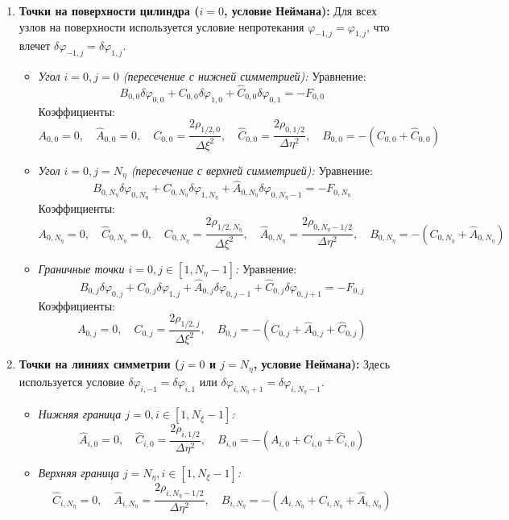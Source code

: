 	\begin{enumerate}
		\item \textbf{Точки на поверхности цилиндра ($i=0$, условие Неймана):} 
		Для всех узлов на поверхности используется условие непротекания $\varphi_{-1,j} = \varphi_{1,j}$, что влечет $\delta\varphi_{-1,j} = \delta\varphi_{1,j}$.
		\begin{itemize}
			\item \textit{Угол $i=0, j=0$ (пересечение с нижней симметрией):}
			Уравнение:
			\[ B_{0,0} \delta\varphi_{0,0} + C_{0,0} \delta\varphi_{1,0} + \hat{C}_{0,0} \delta\varphi_{0,1} = -F_{0,0} \]
			Коэффициенты:
			\[ A_{0,0} = 0, \quad \hat{A}_{0,0} = 0, \quad C_{0,0} = \frac{2\rho_{1/2,0}}{\Delta \xi^2}, \quad \hat{C}_{0,0} = \frac{2\rho_{0,1/2}}{\Delta \eta^2}, \quad B_{0,0} = -(C_{0,0} + \hat{C}_{0,0}) \]
			
			\item \textit{Угол $i=0, j=N_\eta$ (пересечение с верхней симметрией):}
			Уравнение:
			\[ B_{0,N_\eta} \delta\varphi_{0,N_\eta} + C_{0,N_\eta} \delta\varphi_{1,N_\eta} + \hat{A}_{0,N_\eta} \delta\varphi_{0,N_\eta-1} = -F_{0,N_\eta} \]
			Коэффициенты:
			\[ A_{0,N_\eta} = 0, \quad \hat{C}_{0,N_\eta} = 0, \quad C_{0,N_\eta} = \frac{2\rho_{1/2,N_\eta}}{\Delta \xi^2}, \quad \hat{A}_{0,N_\eta} = \frac{2\rho_{0,N_\eta-1/2}}{\Delta \eta^2}, \quad B_{0,N_\eta} = -(C_{0,N_\eta} + \hat{A}_{0,N_\eta}) \]
			
			\item \textit{Граничные точки $i=0, j \in [1, N_\eta-1]$:}
			Уравнение:
			\[ B_{0,j} \delta\varphi_{0,j} + C_{0,j} \delta\varphi_{1,j} + \hat{A}_{0,j} \delta\varphi_{0,j-1} + \hat{C}_{0,j} \delta\varphi_{0,j+1} = -F_{0,j} \]
			Коэффициенты:
			\[ A_{0,j} = 0, \quad C_{0,j} = \frac{2\rho_{1/2,j}}{\Delta \xi^2}, \quad B_{0,j} = -(C_{0,j} + \hat{A}_{0,j} + \hat{C}_{0,j}) \]
		\end{itemize}

		\item \textbf{Точки на линиях симметрии ($j=0$ и $j=N_\eta$, условие Неймана):} 
		Здесь используется условие $\delta\varphi_{i,-1} = \delta\varphi_{i,1}$ или $\delta\varphi_{i,N_\eta+1} = \delta\varphi_{i,N_\eta-1}$.
		\begin{itemize}
			\item \textit{Нижняя граница $j=0, i \in [1, N_\xi-1]$:} 
			\[ \hat{A}_{i,0} = 0, \quad \hat{C}_{i,0} = \frac{2\rho_{i,1/2}}{\Delta \eta^2}, \quad B_{i,0} = -(A_{i,0} + C_{i,0} + \hat{C}_{i,0}) \]
			\item \textit{Верхняя граница $j=N_\eta, i \in [1, N_\xi-1]$:} 
			\[ \hat{C}_{i,N_\eta} = 0, \quad \hat{A}_{i,N_\eta} = \frac{2\rho_{i,N_\eta-1/2}}{\Delta \eta^2}, \quad B_{i,N_\eta} = -(A_{i,N_\eta} + C_{i,N_\eta} + \hat{A}_{i,N_\eta}) \]
		\end{itemize}


\end{enumerate}
